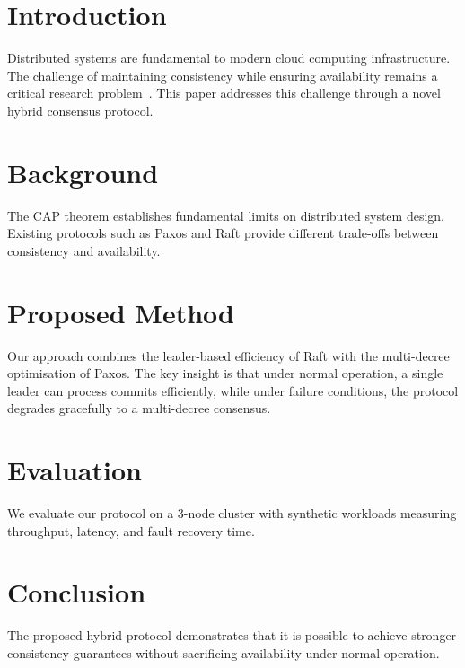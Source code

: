 \documentclass[
    language=english,
    doctype=ieee,
    institution=none,
]{../../omnilatex}
\begin{document}
\maketitle

\begin{abstract}
This paper presents a novel approach to distributed consensus that combines
the strengths of existing protocols while addressing their individual
limitations.  Our hybrid protocol achieves stronger consistency guarantees
while maintaining high availability, demonstrating significant improvements
over state-of-the-art methods on benchmark workloads.
\end{abstract}

\section{Introduction}
Distributed systems are fundamental to modern cloud computing infrastructure.
The challenge of maintaining consistency while ensuring availability remains
a critical research problem~\cite{bibid}.  This paper addresses this
challenge through a novel hybrid consensus protocol.

\section{Background}
The CAP theorem establishes fundamental limits on distributed system
design.  Existing protocols such as Paxos and Raft provide different
trade-offs between consistency and availability.

\section{Proposed Method}
Our approach combines the leader-based efficiency of Raft with the
multi-decree optimisation of Paxos.  The key insight is that under
normal operation, a single leader can process commits efficiently,
while under failure conditions, the protocol degrades gracefully to
a multi-decree consensus.

\section{Evaluation}
We evaluate our protocol on a 3-node cluster with synthetic workloads
measuring throughput, latency, and fault recovery time.

\section{Conclusion}
The proposed hybrid protocol demonstrates that it is possible to achieve
stronger consistency guarantees without sacrificing availability under
normal operation.

\printbibliography
\end{document}
